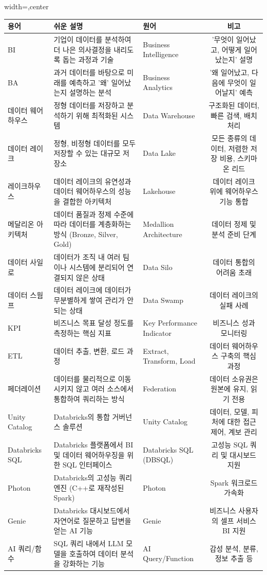 \documentclass[11pt,a4paper]{article}
\theoremstyle{definition}
\begin{document}
\begin{adjustbox}{width=\textwidth,center}
\begin{tabular}{lllc}
\toprule
\textbf{용어} & \textbf{쉬운 설명} & \textbf{원어} & \textbf{비고} \\
\midrule
BI & 기업이 데이터를 분석하여 더 나은 의사결정을 내리도록 돕는 과정과 기술 & Business Intelligence & '무엇이 일어났고, 어떻게 일어났는지' 설명 \\
BA & 과거 데이터를 바탕으로 미래를 예측하고 '왜' 일어났는지 설명하는 분석 & Business Analytics & '왜 일어났고, 다음에 무엇이 일어날지' 예측 \\
데이터 웨어하우스 & 정형 데이터를 저장하고 분석하기 위해 최적화된 시스템 & Data Warehouse & 구조화된 데이터, 빠른 검색, 배치 처리 \\
데이터 레이크 & 정형, 비정형 데이터를 모두 저장할 수 있는 대규모 저장소 & Data Lake & 모든 종류의 데이터, 저렴한 저장 비용, 스키마 온 리드 \\
레이크하우스 & 데이터 레이크의 유연성과 데이터 웨어하우스의 성능을 결합한 아키텍처 & Lakehouse & 데이터 레이크 위에 웨어하우스 기능 통합 \\
메달리온 아키텍처 & 데이터 품질과 정제 수준에 따라 데이터를 계층화하는 방식 (Bronze, Silver, Gold) & Medallion Architecture & 데이터 정제 및 분석 준비 단계 \\
데이터 사일로 & 데이터가 조직 내 여러 팀이나 시스템에 분리되어 연결되지 않은 상태 & Data Silo & 데이터 통합의 어려움 초래 \\
데이터 스웜프 & 데이터 레이크에 데이터가 무분별하게 쌓여 관리가 안 되는 상태 & Data Swamp & 데이터 레이크의 실패 사례 \\
KPI & 비즈니스 목표 달성 정도를 측정하는 핵심 지표 & Key Performance Indicator & 비즈니스 성과 모니터링 \\
ETL & 데이터 추출, 변환, 로드 과정 & Extract, Transform, Load & 데이터 웨어하우스 구축의 핵심 과정 \\
페더레이션 & 데이터를 물리적으로 이동시키지 않고 여러 소스에서 통합하여 쿼리하는 방식 & Federation & 데이터 소유권은 원본에 유지, 읽기 전용 \\
Unity Catalog & Databricks의 통합 거버넌스 솔루션 & Unity Catalog & 데이터, 모델, 피처에 대한 접근 제어, 계보 관리 \\
Databricks SQL & Databricks 플랫폼에서 BI 및 데이터 웨어하우징을 위한 SQL 인터페이스 & Databricks SQL (DBSQL) & 고성능 SQL 쿼리 및 대시보드 지원 \\
Photon & Databricks의 고성능 쿼리 엔진 (C++로 재작성된 Spark) & Photon & Spark 워크로드 가속화 \\
Genie & Databricks 대시보드에서 자연어로 질문하고 답변을 얻는 AI 기능 & Genie & 비즈니스 사용자의 셀프 서비스 BI 지원 \\
AI 쿼리/함수 & SQL 쿼리 내에서 LLM 모델을 호출하여 데이터 분석을 강화하는 기능 & AI Query/Function & 감성 분석, 분류, 정보 추출 등 \\
\bottomrule
\end{tabular}
\end{adjustbox}
\end{document}
